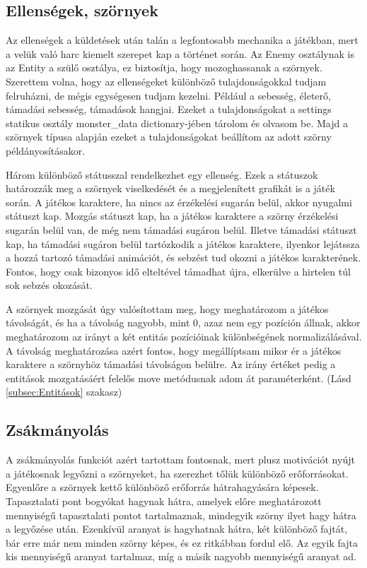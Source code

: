 \subsection{Ellenségek, szörnyek}

 Az ellenségek a küldetések után talán a legfontosabb mechanika a játékban, mert a velük való harc kiemelt szerepet kap a történet során.
Az Enemy osztálynak is az Entity a szülő osztálya, ez biztosítja, hogy mozoghassanak a szörnyek. Szerettem volna, hogy az ellenségeket különböző tulajdonságokkal tudjam felruházni, de mégis egységesen tudjam kezelni. Például a sebesség, életerő, támadási sebesség, támadások hangjai. Ezeket a tulajdonságokat a settings statikus osztály monster\_data dictionary-jében tárolom és olvasom be. Majd a szörnyek típusa alapján ezeket a tulajdonságokat beállítom az adott szörny példányosításakor.

Három különböző státusszal rendelkezhet egy ellenség. Ezek a státuszok határozzák meg a szörnyek viselkedését és a megjelenített grafikát is a játék során. A játékos karaktere, ha nincs az érzékelési sugarán belül, akkor nyugalmi státuszt kap. Mozgás státuszt kap, ha a játékos karaktere a szörny érzékelési sugarán belül van, de még nem támadási sugáron belül.  Illetve támadási státuszt kap, ha támadási sugáron belül tartózkodik a játékos karaktere, ilyenkor lejátssza a hozzá tartozó támadási animációt, és sebzést tud okozni a játékos karakterének. Fontos, hogy csak bizonyos idő elteltével támadhat újra, elkerülve a hirtelen túl sok sebzés okozását. 

A szörnyek mozgását úgy valósítottam meg, hogy meghatározom a játékos távolságát, és ha a távolság nagyobb, mint 0, azaz nem egy pozíción állnak, akkor meghatározom az irányt a két entitás pozícióinak különbségének normalizálásával.
  A távolság meghatározása azért fontos, hogy megállíptsam mikor ér a játékos karaktere a szörnyhöz támadási távolságon belülre.
  Az irány értéket pedig a entitások mozgatásáért felelős move metódusnak adom át paraméterként. (Lásd \ref{subsec:Entitások} szakasz)



\subsection{Zsákmányolás}
 A zsákmányolás funkciót azért tartottam fontosnak, mert plusz motivációt nyújt a játékosnak legyőzni a szörnyeket, ha szerezhet tőlük különböző erőforrásokat. Egyenlőre a szörnyek kettő különböző erőforrás hátrahagyására képesek. Tapasztalati pont bogyókat hagynak hátra, amelyek előre meghatározott mennyiségű tapasztalati pontot tartalmaznak, mindegyik szörny ilyet hagy hátra a legyőzése után. Ezenkívül aranyat is hagyhatnak hátra, két különböző fajtát, bár erre már nem minden szörny képes, és ez ritkábban fordul elő. Az egyik fajta kis mennyiségű aranyat tartalmaz, míg a másik nagyobb mennyiségű aranyat ad. 

